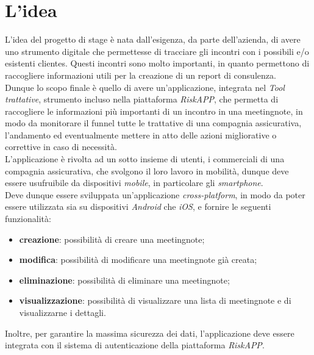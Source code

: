 \section{L'idea}
\label{sec:idea}

L'idea del progetto di stage è nata dall'esigenza, da parte dell'azienda, di avere uno strumento digitale che permettesse di tracciare gli incontri con i possibili e/o esistenti \glspl{cliente}\glsfirstoccur.
Questi incontri sono molto importanti, in quanto permettono di raccogliere informazioni utili per la creazione di un report di consulenza.\\
\indent Dunque lo scopo finale è quello di avere un'applicazione, integrata nel \emph{Tool trattative}, strumento incluso nella piattaforma \emph{RiskAPP}, che permetta di raccogliere le informazioni più importanti di un incontro in una \gls{meetingnote}\glsfirstoccur, in modo da monitorare il \gls{funnel} tutte le trattative di una compagnia assicurativa, l'andamento ed eventualmente mettere in atto delle azioni migliorative o correttive in caso di necessità.\\
\indent L'applicazione è rivolta ad un sotto insieme di utenti, i commerciali di una compagnia assicurativa, che svolgono il loro lavoro in mobilità, dunque deve essere usufruibile da dispositivi \emph{mobile}, in particolare gli \emph{smartphone}.\\
Deve dunque essere sviluppata un'applicazione \emph{cross-platform}, in modo da poter essere utilizzata sia su dispositivi \emph{Android} che \emph{iOS}, e fornire le seguenti funzionalità:
\begin{itemize}
    \item \textbf{creazione}: possibilità di creare una \gls{meetingnote};
    \item \textbf{modifica}: possibilità di modificare una \gls{meetingnote} già creata;
    \item \textbf{eliminazione}: possibilità di eliminare una \gls{meetingnote};
    \item \textbf{visualizzazione}: possibilità di visualizzare una lista di \gls{meetingnote} e di visualizzarne i dettagli.
\end{itemize}
Inoltre, per garantire la massima sicurezza dei dati, l'applicazione deve essere integrata con il sistema di autenticazione della piattaforma \emph{RiskAPP}.


